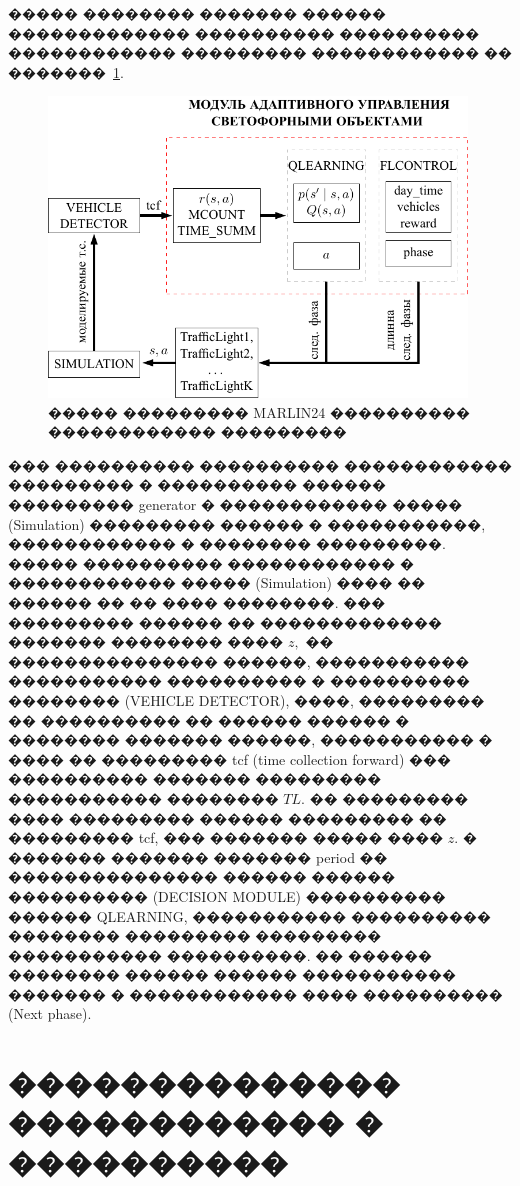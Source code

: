 \documentclass[11pt]{ubs}
\begin{document}
�����  �������� ������� ������ ������������� ���������� ���������� ������������ ���������
������������ �� �������~\ref{fig:MARLIN_alg}.
\begin{figure}[tbph]
  \centering
  \includegraphics[width = 0.99\textwidth, trim = 1.51pt 1.51pt 1.51pt 1.51pt, clip]{mod_scheme.pdf}
  \caption{����� ��������� MARLIN24 ���������� ������������ ���������}\label{fig:MARLIN_alg}
\end{figure}


��� ���������� ���������� ������������ ��������� � ���������� ������ ��������� generator � ������������ ����� (Simulation)    ��������� ������   � �����������, ������������ � �������� ���������. 
����� ���������� ������������ � ������������ ����� (Simulation) ����  �� ������ �� �� ���� ��������. ��� ��������� ������ �� ������������� ������� �������� ���� $z,$ �� ��������������� ������, 
����������� ����������� ���������� � ���������� �������� (VEHICLE DETECTOR), ����, ��������� �� ���������� �� ������ ������ � �������� ������� ������, ����������� � ���� �� ��������� tcf (time collection forward) 
��� ���������� ������� ��������� ����������� �������� $TL.$ 
�� ��������� ���� ��������� ������ ��������� �� ��������� tcf, ��� ������� ����� ���� $z.$ 
� ������� ������� ������� period �� ��������������� ������ ������ ���������� (DECISION MODULE) ���������� ������ QLEARNING,
����������� ���������� �������� ��������� ��������� ����������� ����������. �� ������ �������� ������ ������ ����������� ������� � ������������ ���� ���������� (Next phase). %

\section{�������������� ������������ � ����������}
\end{document}
